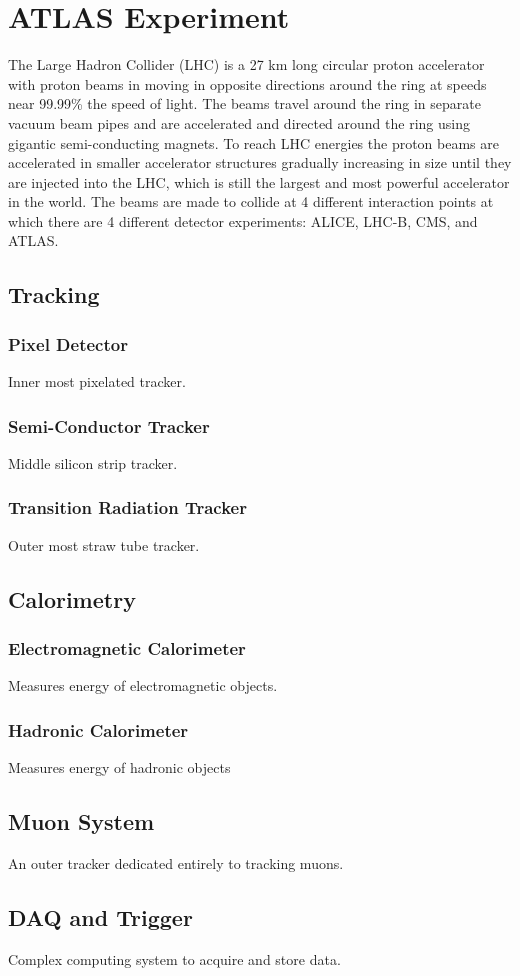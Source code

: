 \chapter{ATLAS Experiment}
The Large Hadron Collider (LHC) is a 27 km long circular proton accelerator with proton beams in moving in opposite directions around the ring at speeds near 99.99\% the speed of light.  The beams travel around the ring in separate vacuum beam pipes and are accelerated and directed around the ring using gigantic semi-conducting magnets.  To reach LHC energies the proton beams are accelerated in smaller accelerator structures gradually increasing in size until they are injected into the LHC, which is still the largest and most powerful accelerator in the world.  The beams are made to collide at 4 different interaction points at which there are 4 different detector experiments: ALICE, LHC-B, CMS, and ATLAS.  

\section{Tracking}
\subsection{Pixel Detector}
Inner most pixelated tracker.
\subsection{Semi-Conductor Tracker}
Middle silicon strip tracker.
\subsection{Transition Radiation Tracker}
Outer most straw tube tracker.

\section{Calorimetry}
\subsection{Electromagnetic Calorimeter}
Measures energy of electromagnetic objects.
\subsection{Hadronic Calorimeter}
Measures energy of hadronic objects

\section{Muon System}
An outer tracker dedicated entirely to tracking muons.

\section{DAQ and Trigger}
Complex computing system to acquire and store data.

